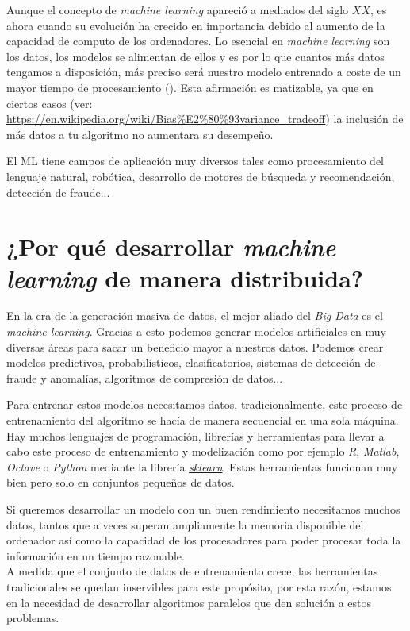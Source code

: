 Aunque el concepto de \textit{machine learning} apareció a mediados del siglo $XX$, es ahora cuando su evolución
ha crecido en importancia debido al aumento de la capacidad de computo de los ordenadores.
Lo esencial en \textit{machine learning} son los datos, los modelos se alimentan de ellos y es por lo que cuantos más
datos tengamos a disposición, más preciso será nuestro modelo entrenado a coste de un mayor
tiempo de procesamiento (\cite{DBLP:books/lib/Bishop07}). Esta afirmación es matizable, ya que en ciertos casos 
(ver: \url{https://en.wikipedia.org/wiki/Bias%E2%80%93variance_tradeoff})
la inclusión de más datos a tu algoritmo no aumentara su desempeño.
\newline

El ML tiene campos de aplicación muy diversos tales como procesamiento del lenguaje natural, robótica,
desarrollo de motores de búsqueda y recomendación, detección de fraude...\\

\section[\textit{Machine Learning} distribuido]{¿Por qué desarrollar \textit{machine learning} de manera distribuida?}
En la era de la generación masiva de datos, el mejor aliado del \textit{Big Data} es el \textit{machine learning}.
Gracias a esto podemos generar modelos artificiales en muy diversas áreas para sacar un beneficio
mayor a nuestros datos. Podemos crear modelos predictivos, probabilísticos, clasificatorios,
sistemas de detección de fraude y anomalías, algoritmos de compresión de datos...
\newline

Para entrenar estos modelos necesitamos datos, tradicionalmente, este proceso de entrenamiento
del algoritmo se hacía de manera secuencial en una sola máquina. Hay muchos lenguajes de programación, 
librerías y herramientas para llevar a cabo este proceso de entrenamiento y modelización como por
ejemplo \textit{R}, \textit{Matlab}, \textit{Octave} o \textit{Python} mediante la librería 
\href{http://scikit-learn.org/stable/}{\textit{sklearn}}.
Estas herramientas funcionan muy bien pero solo en conjuntos pequeños de datos.
\newline

Si queremos desarrollar un modelo con un buen rendimiento necesitamos muchos datos, tantos que a veces
superan ampliamente la memoria disponible del ordenador así como la capacidad de los procesadores para
poder procesar toda la información en un tiempo razonable.\\
A medida que el conjunto de datos de entrenamiento crece, las herramientas tradicionales se quedan
inservibles para este propósito, por esta razón, estamos en la necesidad de desarrollar algoritmos
paralelos que den solución a estos problemas.
\newline

